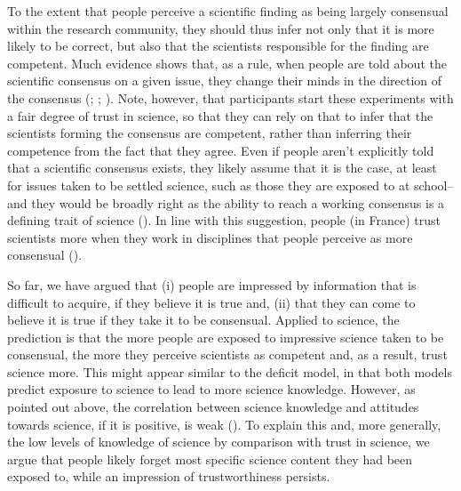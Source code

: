 \documentclass[
  jou,
  floatsintext,
  longtable,
  nolmodern,
  notxfonts,
  notimes,
  colorlinks=true,linkcolor=blue,citecolor=blue,urlcolor=blue]{apa7}
\begin{document}
To the extent that people perceive a scientific finding as being largely
consensual within the research community, they should thus infer not
only that it is more likely to be correct, but also that the scientists
responsible for the finding are competent. Much evidence shows that, as
a rule, when people are told about the scientific consensus on a given
issue, they change their minds in the direction of the consensus
(;
;
). Note, however, that participants start these experiments with a
fair degree of trust in science, so that they can rely on that to infer
that the scientists forming the consensus are competent, rather than
inferring their competence from the fact that they agree. Even if people
aren't explicitly told that a scientific consensus exists, they likely
assume that it is the case, at least for issues taken to be settled
science, such as those they are exposed to at school--and they would be
broadly right as the ability to reach a working consensus is a defining
trait of science
().
In line with this suggestion, people (in France) trust scientists more
when they work in disciplines that people perceive as more consensual
().

So far, we have argued that (i) people are impressed by information that
is difficult to acquire, if they believe it is true and, (ii) that they
can come to believe it is true if they take it to be consensual. Applied
to science, the prediction is that the more people are exposed to
impressive science taken to be consensual, the more they perceive
scientists as competent and, as a result, trust science more. This might
appear similar to the deficit model, in that both models predict
exposure to science to lead to more science knowledge. However, as
pointed out above, the correlation between science knowledge and
attitudes towards science, if it is positive, is weak
().
To explain this and, more generally, the low levels of knowledge of
science by comparison with trust in science, we argue that people likely
forget most specific science content they had been exposed to, while an
impression of trustworthiness persists.
\end{document}
